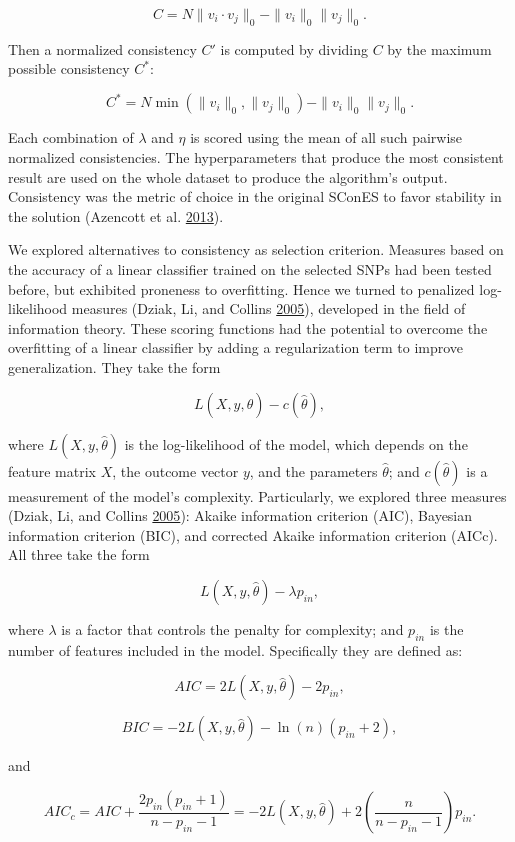 \documentclass[
  11pt,
]{env/yjiao}
\begin{document}
\[ C = N\|v_i \cdot v_j \|_0 - \|v_i\| _0\|v_j\|_0 .\]

Then a normalized consistency \(C'\) is computed by dividing \(C\) by the maximum possible consistency \(C^*\):

\[C^* = N \min(\|v_i\| _0, \|v_j\|_0) - \|v_i\| _0\|v_j\|_0. \]

Each combination of \(\lambda\) and \(\eta\) is scored using the mean of all such pairwise normalized consistencies. The hyperparameters that produce the most consistent result are used on the whole dataset to produce the algorithm's output. Consistency was the metric of choice in the original SConES to favor stability in the solution (Azencott et al. \protect\hyperlink{ref-azencott_efficient_2013}{2013}).

We explored alternatives to consistency as selection criterion. Measures based on the accuracy of a linear classifier trained on the selected SNPs had been tested before, but exhibited proneness to overfitting. Hence we turned to penalized log-likelihood measures (Dziak, Li, and Collins \protect\hyperlink{ref-Dziak2005}{2005}), developed in the field of information theory. These scoring functions had the potential to overcome the overfitting of a linear classifier by adding a regularization term to improve generalization. They take the form

\[L(X,y,\hat{\theta})-c(\hat{\theta}),\]

where \(L(X,y,\hat{\theta})\) is the log-likelihood of the model, which depends on the feature matrix \(X\), the outcome vector \(y\), and the parameters \(\hat{\theta}\); and \(c(\hat{\theta})\) is a measurement of the model's complexity. Particularly, we explored three measures (Dziak, Li, and Collins \protect\hyperlink{ref-Dziak2005}{2005}): Akaike information criterion (AIC), Bayesian information criterion (BIC), and corrected Akaike information criterion (AICc). All three take the form

\[L(X,y,\hat{\theta})-\lambda p_{in},\]

where \(\lambda\) is a factor that controls the penalty for complexity; and \(p_{in}\) is the number of features included in the model. Specifically they are defined as:

\[ AIC=2L(X,y,\hat{\theta})-2p_{in} ,\]

\[ BIC = -2L(X,y,\hat{\theta})-\ln(n)(p_{in}+ 2) ,\]

and

\[ AIC_c=AIC+\frac{2p_{in}(p_{in}+1)}{n-p_{in}-1}=-2L(X,y,\hat{\theta})+2\left(\dfrac{n}{n-p_{in}-1}\right)p_{in} .\]
\end{document}
